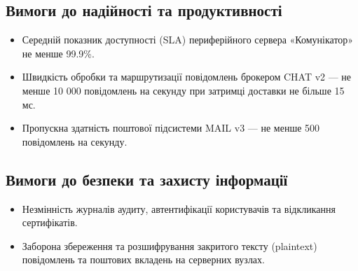 \documentclass{article}
\begin{document}
\subsection{Вимоги до надійності та продуктивності}
\begin{itemize}
    \item Середній показник доступності (SLA) периферійного сервера «Комунікатор» не менше 99.9\%.
    \item Швидкість обробки та маршрутизації повідомлень брокером CHAT v2 — не менше 10 000 повідомлень на секунду при затримці доставки не більше 15 мс.
    \item Пропускна здатність поштової підсистеми MAIL v3 — не менше 500 повідомлень на секунду.
\end{itemize}

\subsection{Вимоги до безпеки та захисту інформації}
\begin{itemize}
    \item Незмінність журналів аудиту, автентифікації користувачів та відкликання сертифікатів.
    \item Заборона збереження та розшифрування закритого тексту (plaintext) повідомлень та поштових вкладень на серверних вузлах.
\end{itemize}
\end{document}
